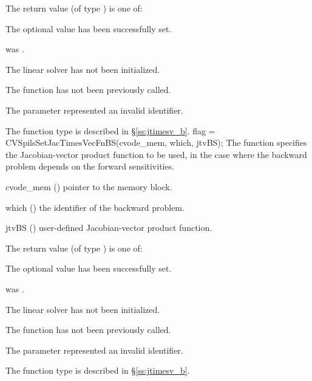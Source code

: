 {
  The return value  (of type ) is one of:
  \begin{args}
  \item[\Id{CVSPILS\_SUCCESS}] 
    The optional value has been successfully set.
  \item[\Id{CVSPILS\_MEM\_NULL}]
     was .
  \item[\Id{CVSPILS\_LMEM\_NULL}]
    The {\cvspils} linear solver has not been initialized.
  \item[\Id{CVSPILS\_NO\_ADJ}]
    The function  has not been previously called.
  \item[\Id{CVSPILS\_ILL\_INPUT}]
    The parameter  represented an invalid identifier.
  \end{args}
}
{
  The function type  is described in \S\ref{ss:jtimesv_b}.
}
{
  flag = CVSpilsSetJacTimesVecFnBS(cvode\_mem, which, jtvBS);
}
{
  The function  specifies the Jacobian-vector 
  product function to be used, in the case where the backward problem
  depends on the forward sensitivities.
}
{
  \begin{args}
  \item[cvode\_mem] ()
    pointer to the {\cvodes} memory block.
  \item[which] ()
    the identifier of the backward problem.
  \item[jtvBS] ()
    user-defined Jacobian-vector product function.
  \end{args}
}
{
  The return value  (of type ) is one of:
  \begin{args}
  \item[\Id{CVSPILS\_SUCCESS}] 
    The optional value has been successfully set.
  \item[\Id{CVSPILS\_MEM\_NULL}]
     was .
  \item[\Id{CVSPILS\_LMEM\_NULL}]
    The {\cvspils} linear solver has not been initialized.
  \item[\Id{CVSPILS\_NO\_ADJ}]
    The function  has not been previously called.
  \item[\Id{CVSPILS\_ILL\_INPUT}]
    The parameter  represented an invalid identifier.
  \end{args}
}
{
  The function type  is described in \S\ref{ss:jtimesv_b}.
}
